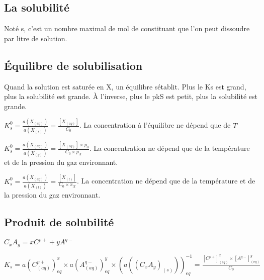 \documentclass[french]{yLectureNote}
\begin{document}
	\subsection{La solubilité}
	Noté s, c'est un nombre maximal de mol de constituant que l'on peut dissoudre par litre de solution.
	\subsection{Équilibre de solubilisation}
	Quand la solution est saturée en X, un équilibre sétablit.
	Plus le Ks est grand, plus la solubilité est grande. À l'inverse, plus le pkS est petit, plus la solubilité est grande.
	\begin{definition}
	\(K_s^0 = \frac{a(X_{(aq)})}{a(X_{(s)})} = \frac{[X_{(aq)}]}{C_0}\). La concentration à l'équilibre ne dépend que de \(T\)
	\end{definition}
	\begin{definition}
	\(K_s^0 = \frac{a(X_{(aq)})}{a(X_{(g)})} = \frac{[X_{(aq)}]\times p_0}{C_0\times p_{X}}\). La concentration ne dépend que de la température et de la pression du gaz environnant.
	\end{definition}
	\begin{definition}
	\(K_s^0 = \frac{a(X_{(aq)})}{a(X_{(l)})} = \frac{[X_{(l)}]}{C_0\times x_{X}}\). La concentration ne dépend que de la température et de la pression du gaz environnant.
	\end{definition}
\subsection{Produit de solubilité}
\begin{definition}
\(C_xA_y = xC^{p+} + yA^{q-}\)
\end{definition}
\begin{definition}
\(K_s = a(C^{p+}_{(aq)})_{eq}^x\times a(A^{q-}_{(aq)})_{eq}^y\times (a((C_xA_y)_{(s)}))^{-1}_{eq} =  \frac{[C^{p+}]^x_{(eq)} \times [A^{q-}]^y_{(eq)}}{C_0} \)
\end{definition}
\end{document}
